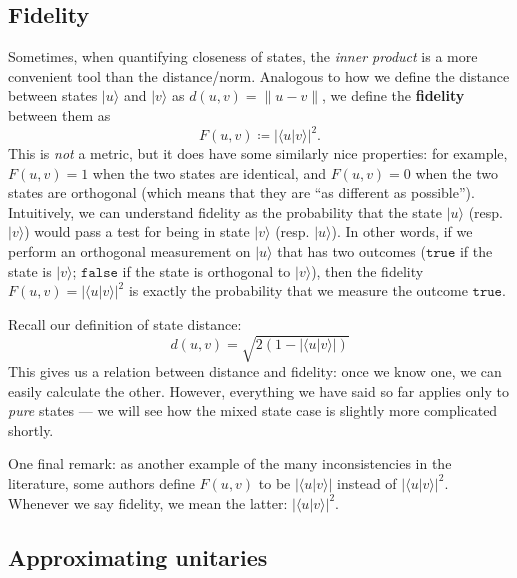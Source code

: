 \documentclass[fleqn,a4paper]{article}
\theoremstyle{definition}
\theoremstyle{definition}
\theoremstyle{definition}
\theoremstyle{definition}
\theoremstyle{remark}
\begin{document}
\hypertarget{fidelity}{%
\subsection{Fidelity}\label{fidelity}}

Sometimes, when quantifying closeness of states, the \emph{inner product} is a more convenient tool than the distance/norm.
Analogous to how we define the distance between states \(|u\rangle\) and \(|v\rangle\) as \(d(u,v)=\|u-v\|\), we define the \textbf{fidelity} between them as
\[
  F(u,v)\coloneqq |\langle u|v\rangle|^2.
\]
This is \emph{not} a metric, but it does have some similarly nice properties: for example, \(F(u,v)=1\) when the two states are identical, and \(F(u,v)=0\) when the two states are orthogonal (which means that they are ``as different as possible'').
Intuitively, we can understand fidelity as the probability that the state \(|u\rangle\) (resp. \(|v\rangle\)) would pass a test for being in state \(|v\rangle\) (resp. \(|u\rangle\)).
In other words, if we perform an orthogonal measurement on \(|u\rangle\) that has two outcomes (\(\texttt{true}\) if the state is \(|v\rangle\); \(\texttt{false}\) if the state is orthogonal to \(|v\rangle\)), then the fidelity \(F(u,v)=|\langle u|v\rangle|^2\) is exactly the probability that we measure the outcome \(\texttt{true}\).

Recall our definition of state distance:
\[
  d(u,v) = \sqrt{2(1-|\langle u|v\rangle|)}
\]
This gives us a relation between distance and fidelity: once we know one, we can easily calculate the other.
However, everything we have said so far applies only to \emph{pure} states --- we will see how the mixed state case is slightly more complicated shortly.

One final remark: as another example of the many inconsistencies in the literature, some authors define \(F(u,v)\) to be \(|\langle u|v\rangle|\) instead of \(|\langle u|v\rangle|^2\).
Whenever we say fidelity, we mean the latter: \(|\langle u|v\rangle|^2\).

\hypertarget{approximating-unitaries}{%
\subsection{Approximating unitaries}\label{approximating-unitaries}}
\end{document}
